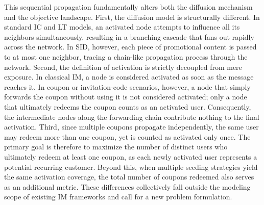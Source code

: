 \documentclass[sigconf]{acmart}
\begin{document}
This sequential propagation fundamentally alters both the diffusion mechanism and the objective landscape. First, the diffusion model is structurally different. In standard IC and LT models, an activated node attempts to influence all its neighbors simultaneously, resulting in a branching cascade that fans out rapidly across the network. In SID, however, each piece of promotional content is passed to at most one neighbor, tracing a chain-like propagation process through the network. Second, the definition of activation is strictly decoupled from mere exposure. In classical IM, a node is considered activated as soon as the message reaches it. In coupon or invitation-code scenarios, however, a node that simply forwards the coupon without using it is not considered activated; only a node that ultimately redeems the coupon counts as an activated user. Consequently, the intermediate nodes along the forwarding chain contribute nothing to the final activation. Third, since multiple coupons propagate independently, the same user may redeem more than one coupon, yet is counted as activated only once. The primary goal is therefore to maximize the number of distinct users who ultimately redeem at least one coupon, as each newly activated user represents a potential recurring customer. Beyond this, when multiple seeding strategies yield the same activation coverage, the total number of coupons redeemed also serves as an additional metric. These differences collectively fall outside the modeling scope of existing IM frameworks and call for a new problem formulation.
\end{document}

